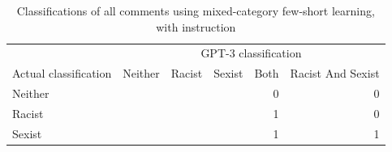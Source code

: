\documentclass[12pt,]{article}
\begin{document}
\begin{table}

\caption{\label{tab:fewshotmixedinstruct-matrix}Classifications of all comments using mixed-category few-short learning, with instruction}
\centering
\begin{tabular}[t]{llllrr}
\toprule
\multicolumn{1}{c}{ } & \multicolumn{5}{c}{GPT-3 classification} \\
\cmidrule(l{3pt}r{3pt}){2-6}
Actual classification & Neither & Racist & Sexist & Both & Racist And Sexist\\
\midrule
Neither & \cellcolor[HTML]{AED581}{1903} & \cellcolor[HTML]{FFFFFF}{374} & \cellcolor[HTML]{FFFFFF}{123} & 0 & 0\\
Racist & \cellcolor[HTML]{FFFFFF}{210} & \cellcolor[HTML]{AED581}{984} & \cellcolor[HTML]{FFFFFF}{5} & 1 & 0\\
Sexist & \cellcolor[HTML]{FFFFFF}{512} & \cellcolor{white}{86} & \cellcolor[HTML]{AED581}{600} & 1 & 1\\
\bottomrule
\end{tabular}
\end{table}
\end{document}

